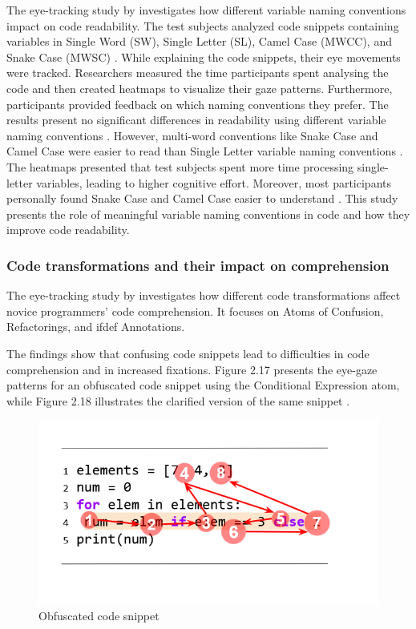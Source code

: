 The eye-tracking study by \citet{broberg2019using} investigates how different variable naming conventions impact on code readability.  
The test subjects analyzed code snippets containing variables in Single Word (SW), Single Letter (SL), Camel Case (MWCC), and Snake Case (MWSC) \cite{broberg2019using}. While explaining the code snippets, their eye movements were tracked. Researchers measured the time participants spent analysing the code and then created heatmaps to visualize their gaze patterns. Furthermore, participants provided feedback on which naming conventions they prefer. The results present no significant differences in readability using different variable naming conventions \cite{broberg2019using}. However, multi-word conventions like Snake Case and Camel Case were easier to read than Single Letter variable naming conventions \cite{broberg2019using}. The heatmaps presented that test subjects spent more time processing single-letter variables, leading to higher cognitive effort. Moreover, most participants personally found Snake Case and Camel Case easier to understand \cite{broberg2019using}. 
This study presents the role of meaningful variable naming conventions in code and how they improve code readability.   

\subsubsection{Code transformations and their impact on comprehension}
The eye-tracking study by \citet{silva2023evaluating} investigates how different code transformations affect novice programmers’ code comprehension. It focuses on Atoms of Confusion, Refactorings, and ifdef Annotations. 

The findings show that confusing code snippets lead to difficulties in code comprehension and in increased fixations. Figure 2.17 presents the eye-gaze patterns for an obfuscated code snippet using the Conditional Expression atom, while Figure 2.18 illustrates the clarified version of the same snippet \cite{silva2023evaluating}. 
 

\begin{figure} [H]
  \centering
  \includegraphics[scale=0.8]{figures/a.png}
  \caption{Obfuscated code snippet \cite[p. 5]{silva2023evaluating}}
  \label{fig:AnhangsChor}
\end{figure}

